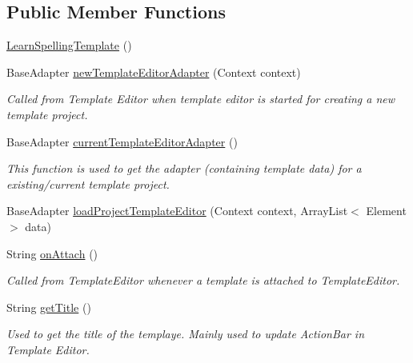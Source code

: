\subsection*{Public Member Functions}
\begin{DoxyCompactItemize}
\item 
\hyperlink{classorg_1_1buildmlearn_1_1toolkit_1_1templates_1_1LearnSpellingTemplate_a09607c7a192a1e5754bfe51d3cac5df9}{Learn\-Spelling\-Template} ()
\item 
Base\-Adapter \hyperlink{classorg_1_1buildmlearn_1_1toolkit_1_1templates_1_1LearnSpellingTemplate_a532c1020ba161742148024ce7346d306}{new\-Template\-Editor\-Adapter} (Context context)
\begin{DoxyCompactList}\small\item\em Called from Template Editor when template editor is started for creating a new template project. \end{DoxyCompactList}\item 
Base\-Adapter \hyperlink{classorg_1_1buildmlearn_1_1toolkit_1_1templates_1_1LearnSpellingTemplate_a46ba1da1d9832f8e2ffbaf5a416a23f8}{current\-Template\-Editor\-Adapter} ()
\begin{DoxyCompactList}\small\item\em This function is used to get the adapter (containing template data) for a existing/current template project. \end{DoxyCompactList}\item 
Base\-Adapter \hyperlink{classorg_1_1buildmlearn_1_1toolkit_1_1templates_1_1LearnSpellingTemplate_a889d8d414440285b80ca93b6a243e05e}{load\-Project\-Template\-Editor} (Context context, Array\-List$<$ Element $>$ data)
\item 
String \hyperlink{classorg_1_1buildmlearn_1_1toolkit_1_1templates_1_1LearnSpellingTemplate_ab644415ca83560eecd107a9d2a22e65b}{on\-Attach} ()
\begin{DoxyCompactList}\small\item\em Called from Template\-Editor whenever a template is attached to Template\-Editor. \end{DoxyCompactList}\item 
String \hyperlink{classorg_1_1buildmlearn_1_1toolkit_1_1templates_1_1LearnSpellingTemplate_a06f51659532ed7300478ad233aa3e8b7}{get\-Title} ()
\begin{DoxyCompactList}\small\item\em Used to get the title of the templaye. Mainly used to update Action\-Bar in Template Editor. \end{DoxyCompactList}\item 

\end{DoxyCompactItemize}
